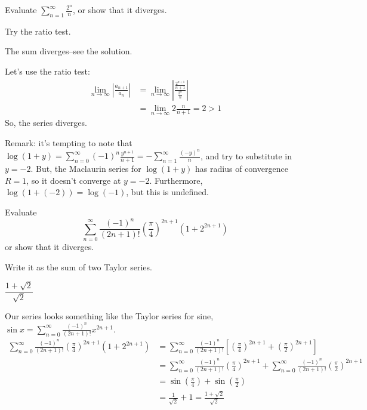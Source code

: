 \begin{question}
	Evaluate $\displaystyle\sum_{n=1}^\infty \frac{2^n}{n}$, or show that it diverges.
\end{question}
\begin{hint}
	Try the ratio test.
\end{hint}
\begin{answer}
	The sum diverges--see the solution.
\end{answer}
\begin{solution}
Let's use the ratio test:
\begin{align*}
\lim_{n \to \infty}\left|\frac{a_{n+1}}{a_n} \right|&=
\lim_{n \to \infty}\left|\frac{\frac{2^{n+1}}{n+1}}{\frac{2^n}{n}} \right|\\
&=
\lim_{n \to \infty}2\frac{n}{n+1}=2>1
\end{align*}
So, the series diverges.

Remark: it's tempting to note that
$\log(1+y)=\displaystyle\sum_{n=0}^\infty (-1)^n\frac{y^{n+1}}{n+1}=-\sum_{n=1}^\infty \frac{(-y)^n}{n}$, and try to substitute in $y=-2$. But, the Maclaurin series for $\log(1+y)$ has radius of convergence $R=1$, so it doesn't converge at $y=-2$. Furthermore, $\log(1+(-2))=\log(-1)$, but this is undefined.
\end{solution}
\begin{question}
	Evaluate
	\[\sum_{n=0}^\infty \frac{(-1)^n}{(2n+1)!}\left(\frac{\pi}{4} \right)^{2n+1}\left(1+2^{2n+1} \right)\]
	or show that it diverges.
\end{question}
\begin{hint}
	Write it as the sum of two Taylor series.
\end{hint}
\begin{answer}
	$\dfrac{1+\sqrt{2}}{\sqrt{2}} $
\end{answer}
\begin{solution}
	Our series looks something like the Taylor series for sine, $\sin x = \displaystyle\sum_{n=0}^\infty \frac{(-1)^{n}}{(2n+1)!}x^{2n+1}$.
	\begin{align*}
	\sum_{n=0}^\infty \frac{(-1)^n}{(2n+1)!}\left(\frac{\pi}{4} \right)^{2n+1}\left(1+2^{2n+1} \right)&=
	\sum_{n=0}^\infty \frac{(-1)^n}{(2n+1)!}\left[\left(\frac{\pi}{4}\right)^{2n+1}+\left(\frac{\pi}{2}\right)^{2n+1} \right]\\
	&=\sum_{n=0}^\infty \frac{(-1)^n}{(2n+1)!}\left(\frac{\pi}{4}\right)^{2n+1}
	+\sum_{n=0}^\infty \frac{(-1)^n}{(2n+1)!}\left(\frac{\pi}{2}\right)^{2n+1}\\
	&=\sin\left(\frac{\pi}{4} \right)+\sin\left(\frac{\pi}{2} \right)\\
	&=\frac{1}{\sqrt{2}}+1=\frac{1+\sqrt{2}}{\sqrt{2}}
	\end{align*}
\end{solution}



